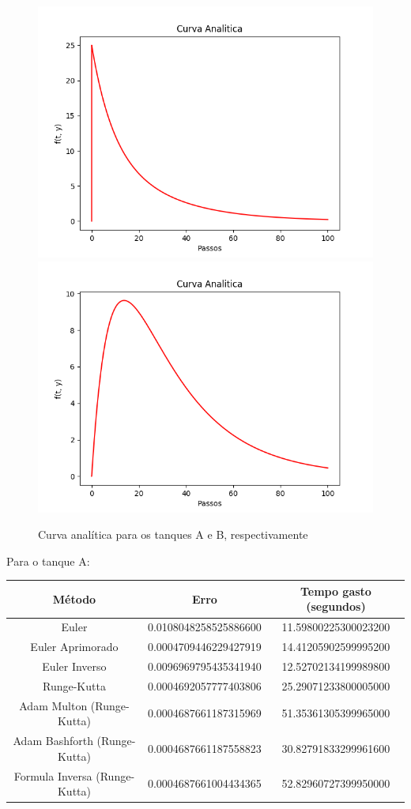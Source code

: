 \documentclass[12pt]{article}%
\begin{document}
    \begin{figure}[H]
        \begin{center}
            \includegraphics[width=.4\textwidth]{problemas/metodos_q1/p1_ta_analitica.png}
            \includegraphics[width=.4\textwidth]{problemas/metodos_q1/p1_tb_analitica.png}
        \end{center}
        \caption{Curva analítica para os tanques A e B, respectivamente}
    \end{figure}
    
    Para o tanque A:
    \begin{center}
    \begin{tabular}{ |c| |c| |c| }
    \hline
     \textbf{Método}               & \textbf{Erro}         & \textbf{Tempo gasto (segundos)} \\ \hline
    Euler                         & 0.0108048258525886600 & 11.59800225300023200            \\ \hline
    Euler Aprimorado              & 0.0004709446229427919 & 14.41205902599995200            \\ \hline
    Euler Inverso                 & 0.0096969795435341940 & 12.52702134199989800            \\ \hline
    Runge-Kutta                   & 0.0004692057777403806 & 25.29071233800005000            \\ \hline
    Adam Multon     (Runge-Kutta) & 0.0004687661187315969 & 51.35361305399965000            \\ \hline
    Adam Bashforth (Runge-Kutta)  & 0.0004687661187558823 & 30.82791833299961600            \\ \hline
    Formula Inversa (Runge-Kutta) & 0.0004687661004434365 & 52.82960727399950000            \\ \hline 
    \end{tabular}
    \end{center}
    
\end{document}
